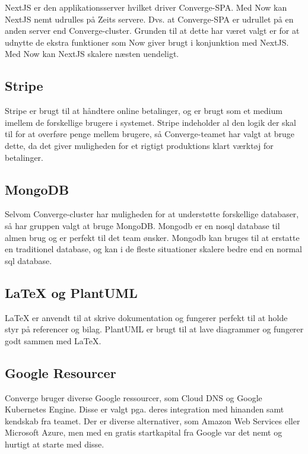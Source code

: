 NextJS er den applikationsserver hvilket driver Converge-SPA. Med Now kan NextJS nemt udrulles på Zeits servere. Dvs. at Converge-SPA er udrullet på en anden server end Converge-cluster. Grunden til at dette har været valgt er for at udnytte de ekstra funktioner som Now giver brugt i konjunktion med NextJS. Med Now kan NextJS skalere næsten uendeligt.

\subsection{Stripe}

Stripe er brugt til at håndtere online betalinger, og er brugt som et medium imellem de forskellige brugere i systemet. Stripe indeholder al den logik der skal til for at overføre penge mellem brugere, så Converge-teamet har valgt at bruge dette, da det giver muligheden for et rigtigt produktions klart værktøj for betalinger.

\subsection{MongoDB}

Selvom Converge-cluster har muligheden for at understøtte forskellige databaser, så har gruppen valgt at bruge MongoDB. Mongodb er en nosql \cite[nosql]{converge-terms} database til almen brug og er perfekt til det team ønsker. Mongodb kan bruges til at erstatte en traditionel database, og kan i de fleste situationer skalere bedre end en normal sql database.

\subsection{LaTeX og PlantUML}

LaTeX er anvendt til at skrive dokumentation og fungerer perfekt til at holde styr på referencer og bilag. PlantUML er brugt til at lave diagrammer og fungerer godt sammen med LaTeX.

\subsection{Google Resourcer}

Converge bruger diverse Google ressourcer, som Cloud DNS \cite{application-development-dokumentation} og Google Kubernetes Engine. Disse er valgt pga. deres integration med hinanden samt kendskab fra teamet. Der er diverse alternativer, som Amazon Web Services eller Microsoft Azure, men med en gratis startkapital fra Google var det nemt og hurtigt at starte med disse.